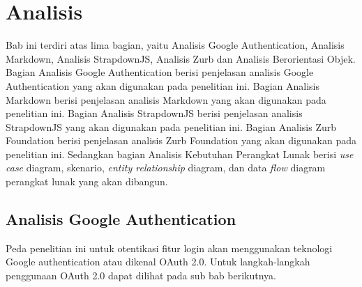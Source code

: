 \chapter{Analisis}
\label{chap:analisis}

Bab ini terdiri atas lima bagian, yaitu Analisis Google Authentication, Analisis
Markdown, Analisis StrapdownJS, Analisis Zurb dan Analisis Berorientasi Objek.
Bagian Analisis Google Authentication berisi penjelasan analisis Google
Authentication yang akan digunakan pada penelitian ini. Bagian Analisis Markdown
berisi penjelasan analisis Markdown yang akan digunakan pada penelitian ini.
Bagian Analisis StrapdownJS berisi penjelasan analisis StrapdownJS yang akan
digunakan pada penelitian ini. Bagian Analisis Zurb Foundation berisi penjelasan
analisis Zurb Foundation yang akan digunakan pada penelitian ini. Sedangkan
bagian Analisis Kebutuhan Perangkat Lunak berisi {\it use case} diagram,
skenario, {\it entity relationship} diagram, dan data {\it flow} diagram
perangkat lunak yang akan dibangun.

\section{Analisis Google Authentication}
\label{sec:analisisGoogleAuthentication}

Peda penelitian ini untuk otentikasi fitur login akan menggunakan teknologi
Google authentication atau dikenal OAuth 2.0. Untuk langkah-langkah penggunaan
OAuth 2.0 dapat dilihat pada sub bab berikutnya.


